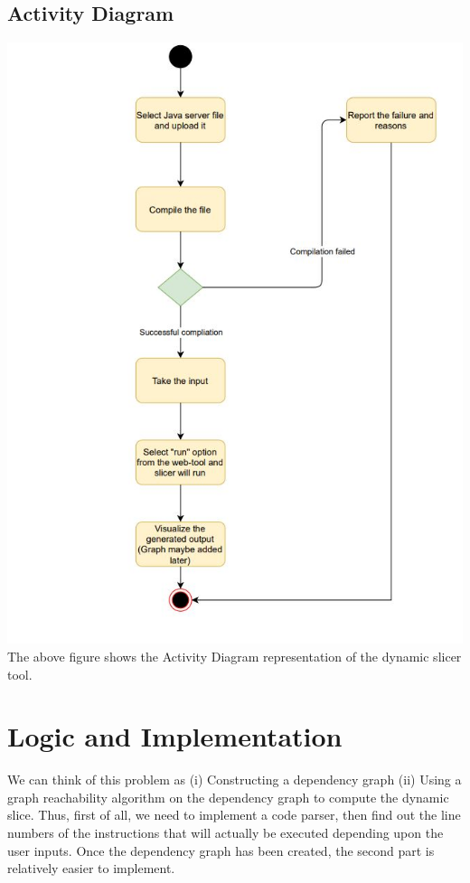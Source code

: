 \documentclass[conference]{IEEEtran}
\begin{document}
\subsection{Activity Diagram}
    \includegraphics[scale = 0.6]{project1.JPG}
The above figure shows the Activity Diagram representation of the dynamic slicer tool. 
\section{Logic and Implementation}
We can think of this problem as (i) Constructing a dependency graph (ii) Using a graph reachability algorithm on the dependency graph to compute the dynamic slice. Thus, first of all, we need to implement a code parser, then find out the line numbers of the instructions that will actually be executed depending upon the user inputs. Once the dependency graph has been created, the second part is relatively easier to implement.
\end{document}
